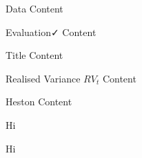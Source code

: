 \documentclass[
	landscape,       %
]{ImperialPoster}
\begin{document}
\medskip %
\begin{multicols}{3}
	\begin{main-section}{Data}{\faChartArea}
		Content
	\end{main-section}

	\begin{main-section}{Evaluation}{\faCheck}
		Content
	\end{main-section}

	\begin{description-section}{Title}
		Content
	\end{description-section}

	\begin{data-model-section}{Realised Variance $RV_{t}$}
		Content
	\end{data-model-section}

	\begin{model-section}{Heston}
		Content
	\end{model-section}


	\columnbreak{}

	\begin{tcolorbox}[
		enhanced jigsaw,
		parskip,
		opacityback=0,
		colframe=ICLGreen!90!ICLGrey,
		fonttitle=\bfseries,
		before upper={\setlength{\baselineskip}{1.2\baselineskip}\setlength{\abovedisplayskip}{20pt}\setlength{\belowdisplayskip}{20pt}},
		boxsep=10pt
	]
		\color{ICLWhite}
		Hi
	\end{tcolorbox}

	\columnbreak{}

	\begin{tcolorbox}[
		standard jigsaw,
		parskip,
		opacityback=0,
		colframe=ICLGreen!90!ICLGrey,
		fonttitle=\bfseries,
		before upper={\setlength{\baselineskip}{1.2\baselineskip}\setlength{\abovedisplayskip}{20pt}\setlength{\belowdisplayskip}{20pt}},
		boxsep=10pt
	]
		Hi
	\end{tcolorbox}
\end{multicols}
\end{document}
